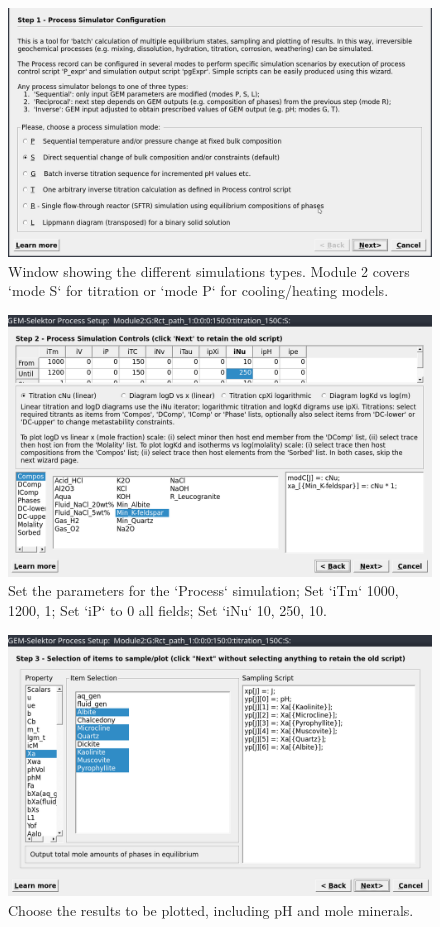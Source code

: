 \documentclass[
]{book}
\begin{document}
\begin{figure}
\includegraphics[width=0.9\linewidth]{figures/module2/fig-7} \caption{Window showing the different simulations types. Module 2 covers `mode S` for titration  or `mode P` for cooling/heating models.}\label{fig:fig-7b}
\end{figure}
\begin{figure}
\includegraphics[width=0.9\linewidth]{figures/module2/fig-8} \caption{Set the parameters for the `Process` simulation; Set `iTm` 1000, 1200, 1; Set `iP` to 0 all fields; Set `iNu` 10, 250, 10.}\label{fig:fig-8b}
\end{figure}

\begin{figure}
\includegraphics[width=0.9\linewidth]{figures/module2/fig-9} \caption{Choose the results to be plotted, including pH and mole minerals.}\label{fig:fig-9b}
\end{figure}
\end{document}
